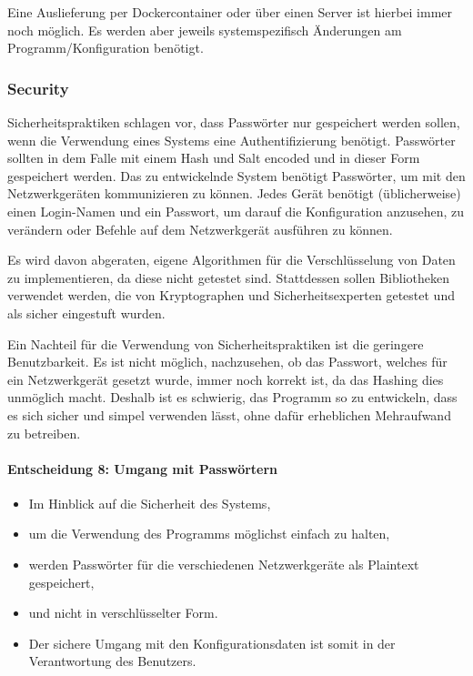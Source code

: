 \documentclass[
	ngerman,
	toc=listof, %
	toc=bibliography, %
	footnotes=multiple, %
	parskip=half, %
	numbers=noendperiod %
]{scrartcl}
\begin{document}
		Eine Auslieferung per Dockercontainer oder über einen Server ist hierbei immer noch möglich. 
		Es werden aber jeweils systemspezifisch Änderungen am Programm/Konfiguration benötigt.
		\newpage

		\subsubsection{Security}
		Sicherheitspraktiken schlagen vor, dass Passwörter nur gespeichert werden sollen, wenn die Verwendung eines Systems eine Authentifizierung benötigt.
		Passwörter sollten in dem Falle mit einem Hash und Salt encoded und in dieser Form gespeichert werden. 
		Das zu entwickelnde System benötigt Passwörter, um mit den Netzwerkgeräten kommunizieren zu können. 
		Jedes Gerät benötigt (üblicherweise) einen Login-Namen und ein Passwort, um darauf die Konfiguration anzusehen, zu verändern oder Befehle auf dem Netzwerkgerät ausführen zu können.

		Es wird davon abgeraten, eigene Algorithmen für die Verschlüsselung von Daten zu implementieren, da diese nicht getestet sind. 
		Stattdessen sollen Bibliotheken verwendet werden, die von Kryptographen und Sicherheitsexperten getestet und als sicher eingestuft wurden.

		Ein Nachteil für die Verwendung von Sicherheitspraktiken ist die geringere Benutzbarkeit.
		Es ist nicht möglich, nachzusehen, ob das Passwort, welches für ein Netzwerkgerät gesetzt wurde, immer noch korrekt ist, da das Hashing dies unmöglich macht.
		Deshalb ist es schwierig, das Programm so zu entwickeln, dass es sich sicher und simpel verwenden lässt, ohne dafür erheblichen Mehraufwand zu betreiben.

		\paragraph{Entscheidung 8: Umgang mit Passwörtern}
		\begin{itemize}
			\item Im Hinblick auf die Sicherheit des Systems,
			\item um die Verwendung des Programms möglichst einfach zu halten,
			\item werden Passwörter für die verschiedenen Netzwerkgeräte als Plaintext gespeichert,
			\item und nicht in verschlüsselter Form.
			\item Der sichere Umgang mit den Konfigurationsdaten ist somit in der Verantwortung des Benutzers.
		\end{itemize}
\end{document}
